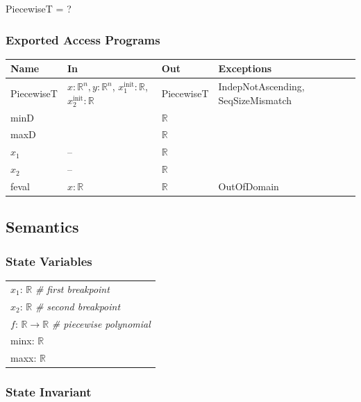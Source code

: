 \documentclass[12pt, titlepage]{article}
\begin{document}
PiecewiseT = ?

\subsubsection{Exported Access Programs}

\begin{center}
\begin{tabular}{p{3cm} p{6cm} p{2cm} p{4cm}}
  \hline
  \textbf{Name} & \textbf{In} & \textbf{Out} & \textbf{Exceptions} \\
  \hline
  PiecewiseT & $x: \mathbb{R}^n, y: \mathbb{R}^n$, $x_1^\text{init}:
               \mathbb{R}$, $x_2^\text{init}: \mathbb{R}$ & PiecewiseT & IndepNotAscending,\newline
                                                     SeqSizeMismatch\\
  minD & ~ & $\mathbb{R}$ & ~\\
  maxD & ~ & $\mathbb{R}$ & ~\\
  $x_1$ & -- & $\mathbb{R}$ &~\\
  $x_2$ & -- & $\mathbb{R}$ &~\\
  feval & $x: \mathbb{R}$ & $\mathbb{R}$ & OutOfDomain\\
  \hline
\end{tabular}
\end{center}

\subsection{Semantics}

\subsubsection{State Variables}

\renewcommand{\arraystretch}{1.2}
\begin{longtable*}[l]{l} 
$x_1$: $\mathbb{R}$ \emph{\# first breakpoint}\\ 
$x_2$: $\mathbb{R}$ \emph{\# second breakpoint}\\ 
$f$: $\mathbb{R} \rightarrow \mathbb{R}$ \emph{\# piecewise polynomial}\\ 
minx: $\mathbb{R}$\\
maxx: $\mathbb{R}$\\

\end{longtable*}

\subsubsection* {State Invariant}
\end{document}
